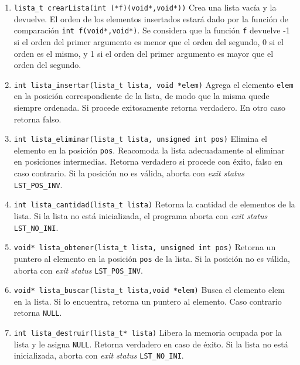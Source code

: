\documentclass[12pt,a4paper]{article}
\begin{document}
\begin{enumerate}
	
	\item \texttt{lista\_t  crearLista(int (*f)(void*,void*))} Crea una lista vacía y la devuelve. El orden de los elementos insertados estará dado por la función de comparación \texttt{int f(void*,void*)}. Se considera que la función \texttt{f} devuelve -1 si el orden del primer argumento es menor que el orden del segundo, 0 si el orden es el mismo, y 1 si el orden del primer argumento es mayor que el orden del segundo.
	
	\item \texttt{int lista\_insertar(lista\_t lista,  void *elem)}
	Agrega el elemento \texttt{elem} en la posición correspondiente de la lista, de modo que la misma quede siempre ordenada.
	Si procede exitosamente retorna verdadero. En otro caso retorna falso.
	
	\item \texttt{int lista\_eliminar(lista\_t lista, unsigned int pos)} Elimina
	el elemento en la posición \texttt{pos}. Reacomoda la lista adecuadamente
	al eliminar en posiciones intermedias. Retorna verdadero si procede con
	éxito, falso en caso contrario. Si la posición no es válida, aborta con
	\emph{exit status} \texttt{LST\_POS\_INV}.
	
	\item \texttt{int lista\_cantidad(lista\_t lista)} Retorna la cantidad de
	elementos de la lista. Si la lista no está inicializada, el programa aborta
	con \emph{exit status} \texttt{LST\_NO\_INI}.
	
	\item \texttt{void* lista\_obtener(lista\_t lista, unsigned int pos)} Retorna
	un puntero al elemento en la posición \texttt{pos} de la lista. Si la posición no es
	válida, aborta con \emph{exit status} \texttt{LST\_POS\_INV}.
	
	\item \texttt{void* lista\_buscar(lista\_t lista,void *elem)} Busca el elemento elem 
	en la lista. Si lo encuentra, retorna un puntero al elemento. Caso contrario 
	retorna \texttt{NULL}.
	
	
	\item \texttt{int lista\_destruir(lista\_t* lista)} Libera la memoria ocupada
	por la lista y le asigna \texttt{NULL}. Retorna verdadero en caso de éxito.
	Si la lista no está inicializada, aborta con \emph{exit status}
	\texttt{LST\_NO\_INI}.
	
\end{enumerate}
\end{document}
